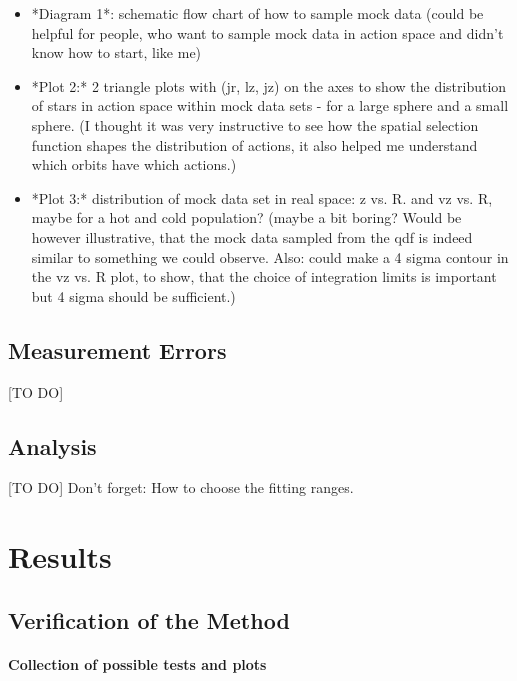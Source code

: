 \documentclass[12pt,preprint]{aastex}
\begin{document}
\begin{itemize}
\item *Diagram 1*: schematic flow chart of how to sample mock data (could be helpful for people, who want to sample mock data in action space and didn't know how to start, like me)
\item *Plot 2:* 2 triangle plots with (jr, lz, jz) on the axes to show the distribution of stars in action space within mock data sets - for a large sphere and a small sphere. (I thought it was very instructive to see how the spatial selection function shapes the distribution of actions, it also helped me understand which orbits have which actions.)
\item *Plot 3:* distribution of mock data set in real space: z vs. R. and vz vs. R, maybe for a hot and cold population? (maybe a bit boring? Would be however illustrative, that the mock data sampled from the qdf is indeed similar to something we could observe. Also: could make a 4 sigma contour in the vz vs. R plot, to show, that the choice of integration limits is important but 4 sigma should be sufficient.)
\end{itemize}

\subsection{Measurement Errors}

[TO DO]

\subsection{Analysis}

[TO DO] Don't forget: How to choose the fitting ranges.

\section{Results}

\subsection{Verification of the Method}

\paragraph{Collection of possible tests and plots}
\end{document}
